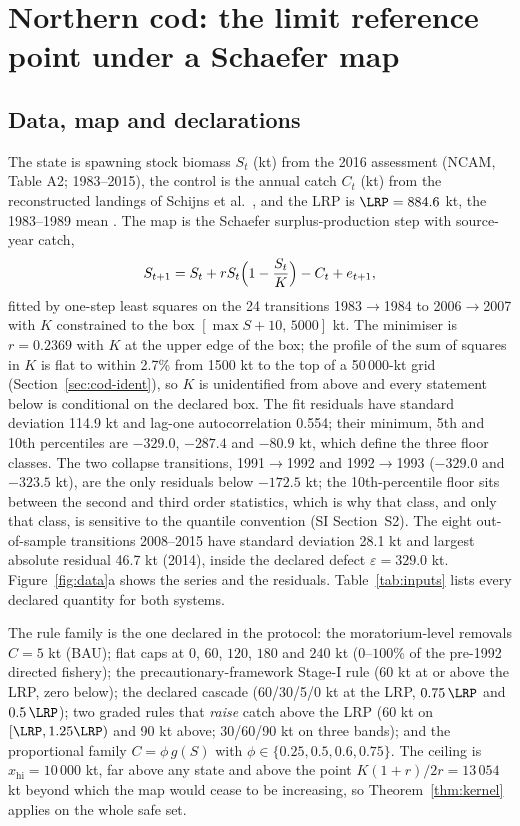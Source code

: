 \section{Northern cod: the limit reference point under a Schaefer map}\label{sec:cod}

\subsection{Data, map and declarations}\label{sec:cod-data}

The state is spawning stock biomass $S_t$ (kt) from the 2016 assessment (NCAM, Table A2; 1983--2015), the control is the annual catch $C_t$ (kt) from the reconstructed landings of Schijns et al.~\cite{Schijns2021}, and the LRP is $\LRP=884.6$ kt, the 1983--1989 mean \cite{DFO2016}. The map is the Schaefer surplus-production step with source-year catch,
\begin{equation}\label{eq:cod-map}
S_{t+1}=S_t+rS_t\Bigl(1-\frac{S_t}{K}\Bigr)-C_t+e_{t+1},
\end{equation}
fitted by one-step least squares on the 24 transitions 1983$\to$1984 to 2006$\to$2007 with $K$ constrained to the box $[\max S+10,\,5000]$ kt. The minimiser is $r=0.2369$ with $K$ at the upper edge of the box; the profile of the sum of squares in $K$ is flat to within 2.7\% from 1500 kt to the top of a 50\,000-kt grid (Section~\ref{sec:cod-ident}), so $K$ is unidentified from above and every statement below is conditional on the declared box. The fit residuals have standard deviation 114.9 kt and lag-one autocorrelation 0.554; their minimum, 5th and 10th percentiles are $-329.0$, $-287.4$ and $-80.9$ kt, which define the three floor classes. The two collapse transitions, 1991$\to$1992 and 1992$\to$1993 ($-329.0$ and $-323.5$ kt), are the only residuals below $-172.5$ kt; the 10th-percentile floor sits between the second and third order statistics, which is why that class, and only that class, is sensitive to the quantile convention (SI Section~S2). The eight out-of-sample transitions 2008--2015 have standard deviation 28.1 kt and largest absolute residual 46.7 kt (2014), inside the declared defect $\varepsilon=329.0$ kt. Figure~\ref{fig:data}a shows the series and the residuals. Table~\ref{tab:inputs} lists every declared quantity for both systems.



The rule family is the one declared in the protocol: the moratorium-level removals $C=5$ kt (BAU); flat caps at $0$, $60$, $120$, $180$ and $240$ kt ($0$--$100\%$ of the pre-1992 directed fishery); the precautionary-framework Stage-I rule (60 kt at or above the LRP, zero below); the declared cascade (60/30/5/0 kt at the LRP, $0.75\,\LRP$ and $0.5\,\LRP$); two graded rules that \emph{raise} catch above the LRP (60 kt on $[\LRP,1.25\LRP)$ and 90 kt above; 30/60/90 kt on three bands); and the proportional family $C=\phi\,g(S)$ with $\phi\in\{0.25,0.5,0.6,0.75\}$. The ceiling is $x_{\mathrm{hi}}=10\,000$ kt, far above any state and above the point $K(1+r)/2r=13\,054$ kt beyond which the map would cease to be increasing, so Theorem~\ref{thm:kernel} applies on the whole safe set.


